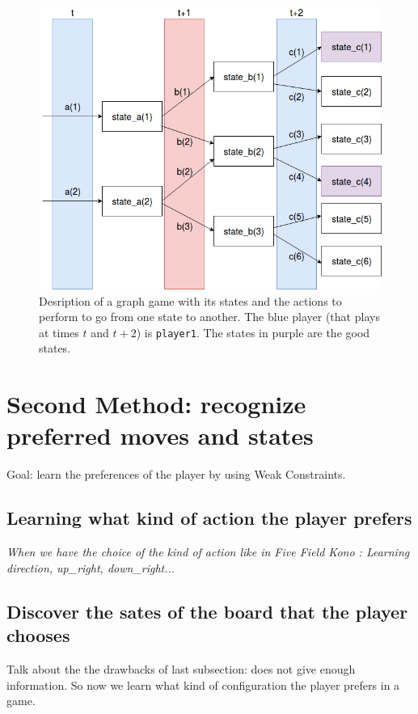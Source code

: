 \documentclass[12pt,twoside]{report}
\begin{document}
\begin{figure}[h]
\centering
\includegraphics[width = 0.8\hsize]{graph_game.png}
\caption{Desription of a graph game with its states and the actions to perform to go from one state to another. The blue player (that plays at times $t$ and $t+2$) is \texttt{player1}. The states in purple are the good states.}
\label{fig:graph_game}
\end{figure}

\section{Second Method: recognize preferred moves and states}

Goal: learn the preferences of the player by using Weak Constraints.

\subsection{Learning what kind of action the player prefers}

\emph{When we have the choice of the kind of action like in Five Field Kono : Learning  direction, up\_right, down\_right... }


\subsection{Discover the sates of the board that the player chooses}

Talk about the the drawbacks of last subsection: does not give enough information. So now we learn what kind of configuration the player prefers in a game. 
\end{document}
